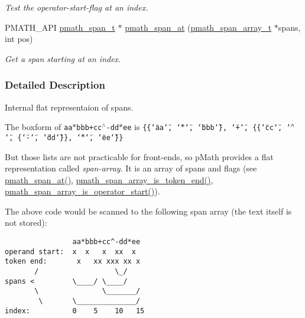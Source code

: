 \begin{CompactItemize}
\begin{CompactList}\small\item\em Test the operator-start-flag at an index. \item\end{CompactList}\item 
PMATH\_\-API \hyperlink{classpmath__span__t}{pmath\_\-span\_\-t} $\ast$ \hyperlink{group__parser_g8f106cc9c1ae23635bbd759072505c27}{pmath\_\-span\_\-at} (\hyperlink{classpmath__span__array__t}{pmath\_\-span\_\-array\_\-t} $\ast$spans, int pos)
\begin{CompactList}\small\item\em Get a span starting at an index. \item\end{CompactList}\end{CompactItemize}


\subsubsection{Detailed Description}
Internal flat representaion of spans. 

The boxform of {\tt aa$\ast$bbb+cc$^\wedge$-dd$\ast$ee} is {\tt \{\{\char`\"{}aa\char`\"{}, \char`\"{}$\ast$\char`\"{}, \char`\"{}bbb\char`\"{}\}, \char`\"{}+\char`\"{}, \{\{\char`\"{}cc\char`\"{}, \char`\"{}$^\wedge$\char`\"{}, \{\char`\"{}-\char`\"{}, \char`\"{}dd\char`\"{}\}\}, \char`\"{}$\ast$\char`\"{}, \char`\"{}ee\char`\"{}\}\}}

But those lists are not practicable for front-ends, so pMath provides a flat representation called {\em span-array\/}. It is an array of spans and flags (see \hyperlink{group__parser_g8f106cc9c1ae23635bbd759072505c27}{pmath\_\-span\_\-at()}, \hyperlink{group__parser_g0bb7df579ed425ec719cf2eb85093517}{pmath\_\-span\_\-array\_\-is\_\-token\_\-end()}, \hyperlink{group__parser_g7ca9a7b13aef344ba903b33f07ba912a}{pmath\_\-span\_\-array\_\-is\_\-operator\_\-start()}).

The above code would be scanned to the following span array (the text itself is not stored): 

\begin{footnotesize}\begin{verbatim}
                aa*bbb+cc^-dd*ee
operand start:  x  x   x  xx  x
token end:       x   xx xxx xx x
       /                  \_/
spans <         \____/ \____/
       \               \_______/
        \       \______________/
index:          0    5    10   15
   \end{verbatim}
\end{footnotesize}


